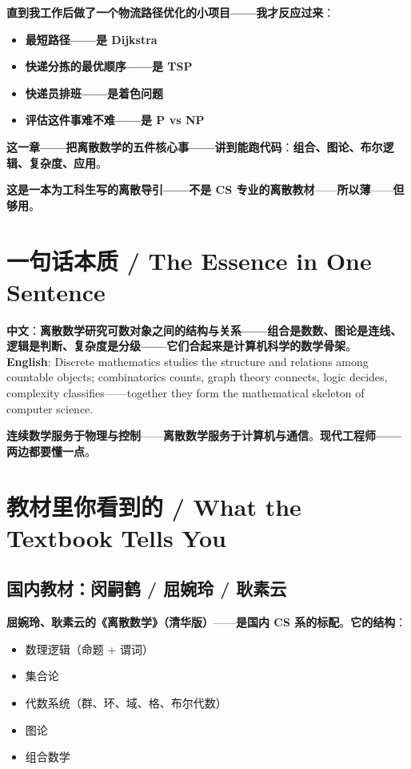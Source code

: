 \textbf{直到我工作后做了一个\textbf{物流路径优化的小项目}——\textbf{我才反应过来}}：

\begin{itemize}
\item \textbf{最短路径——是 Dijkstra}
\item \textbf{快递分拣的最优顺序——是 TSP}
\item \textbf{快递员排班——是着色问题}
\item \textbf{评估这件事难不难——是 P vs NP}
\end{itemize}

\textbf{这一章——\textbf{把离散数学的五件核心事——讲到能跑代码}}：\textbf{组合、图论、布尔逻辑、复杂度、应用}。

\textbf{这是一本\textbf{为工科生写的离散导引}——不是 CS 专业的离散教材}——\textbf{所以薄}——\textbf{但够用}。

\section{一句话本质 / The Essence in One Sentence}

\begin{tcolorbox}[essbox={一句话本质}]
\textbf{中文}：\textbf{离散数学研究\textbf{可数对象之间的结构与关系}——\textbf{组合是数数、图论是连线、逻辑是判断、复杂度是分级}——\textbf{它们合起来是\textbf{计算机科学的数学骨架}}}。\\[6pt]
\textbf{English}: Discrete mathematics studies the structure and relations among countable objects; combinatorics counts, graph theory connects, logic decides, complexity classifies——together they form the mathematical skeleton of computer science.
\end{tcolorbox}

\textbf{连续数学服务于物理与控制}——\textbf{离散数学服务于计算机与通信}。\textbf{现代工程师——两边都要懂一点}。

\section{教材里你看到的 / What the Textbook Tells You}

\subsection{国内教材：闵嗣鹤 / 屈婉玲 / 耿素云}

\textbf{屈婉玲、耿素云的《离散数学》（清华版）}——\textbf{是国内 CS 系的标配}。\textbf{它的结构}：

\begin{itemize}
\item 数理逻辑（命题 + 谓词）
\item 集合论
\item 代数系统（群、环、域、格、布尔代数）
\item 图论
\item 组合数学
\end{itemize}

